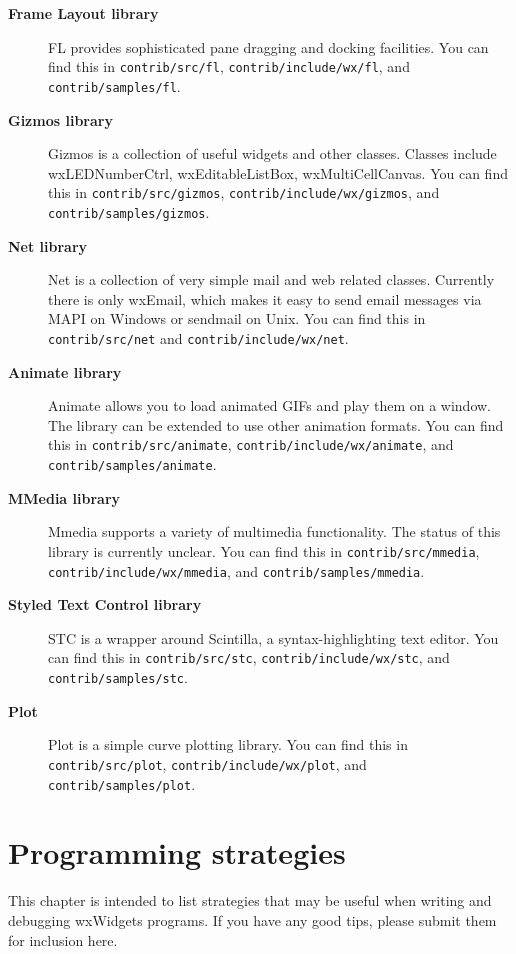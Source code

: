 \begin{description}
\item[{\bf Frame Layout library}]
FL provides sophisticated pane dragging and docking facilities.
You can find this in {\tt contrib/src/fl}, {\tt contrib/include/wx/fl}, and {\tt contrib/samples/fl}.
\item[{\bf Gizmos library}]
Gizmos is a collection of useful widgets and other classes. Classes include wxLEDNumberCtrl,
wxEditableListBox, wxMultiCellCanvas.
You can find this in {\tt contrib/src/gizmos}, {\tt contrib/include/wx/gizmos}, and {\tt contrib/samples/gizmos}.
\item[{\bf Net library}]
Net is a collection of very simple mail and web related classes. Currently
there is only wxEmail, which makes it easy to send email messages via MAPI on Windows or sendmail on Unix.
You can find this in {\tt contrib/src/net} and {\tt contrib/include/wx/net}.
\item[{\bf Animate library}]
Animate allows you to load animated GIFs and play them on a window. The library can be extended
to use other animation formats.
You can find this in {\tt contrib/src/animate}, {\tt contrib/include/wx/animate}, and {\tt contrib/samples/animate}.
\item[{\bf MMedia library}]
Mmedia supports a variety of multimedia functionality. The status of this library is currently unclear.
You can find this in {\tt contrib/src/mmedia}, {\tt contrib/include/wx/mmedia}, and {\tt contrib/samples/mmedia}.
\item[{\bf Styled Text Control library}]
STC is a wrapper around Scintilla, a syntax-highlighting text editor.
You can find this in {\tt contrib/src/stc}, {\tt contrib/include/wx/stc}, and {\tt contrib/samples/stc}.
\item[{\bf Plot}]
Plot is a simple curve plotting library.
You can find this in {\tt contrib/src/plot}, {\tt contrib/include/wx/plot}, and {\tt contrib/samples/plot}.
\end{description}

\chapter{Programming strategies}\label{strategies}
%
\setfooter{\thepage}{}{}{}{}{\thepage}%

This chapter is intended to list strategies that may be useful when
writing and debugging wxWidgets programs. If you have any good tips,
please submit them for inclusion here.

